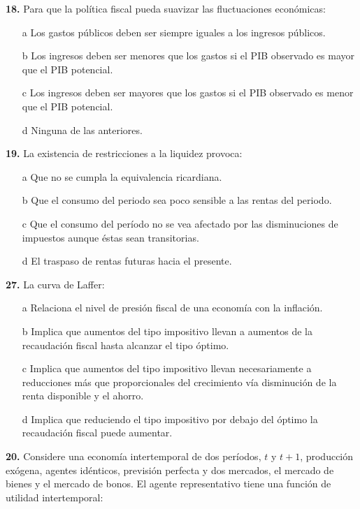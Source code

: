 \documentclass{nuevotema}
\begin{document}
\textbf{18.} Para que la política fiscal pueda suavizar las fluctuaciones económicas:

\begin{itemize}
	\item[a] Los gastos públicos deben ser siempre iguales a los ingresos públicos.
	\item[b] Los ingresos deben ser menores que los gastos si el PIB observado es mayor que el PIB potencial.
	\item[c] Los ingresos deben ser mayores que los gastos si el PIB observado es menor que el PIB potencial.
	\item[d] Ninguna de las anteriores.
\end{itemize}


\textbf{19.} La existencia de restricciones a la liquidez provoca:
\begin{itemize}
	\item[a] Que no se cumpla la equivalencia ricardiana.
	\item[b] Que el consumo del periodo sea poco sensible a las rentas del periodo.
	\item[c] Que el consumo del período no se vea afectado por las disminuciones de impuestos aunque éstas sean transitorias.
	\item[d] El traspaso de rentas futuras hacia el presente.
\end{itemize}

\textbf{27.} La curva de Laffer:
\begin{itemize}
	\item[a] Relaciona el nivel de presión fiscal de una economía con la inflación.
	\item[b] Implica que aumentos del tipo impositivo llevan a aumentos de la recaudación fiscal hasta alcanzar el tipo óptimo.
	\item[c] Implica que aumentos del tipo impositivo llevan necesariamente a reducciones más que proporcionales del crecimiento vía disminución de la renta disponible y el ahorro.
	\item[d] Implica que reduciendo el tipo impositivo por debajo del óptimo la recaudación fiscal puede aumentar.
\end{itemize}

\textbf{20.} Considere una economía intertemporal de dos períodos, $t$ y $t+1$, producción exógena, agentes idénticos, previsión perfecta y dos mercados, el mercado de bienes y el mercado de bonos. El agente representativo tiene una función de utilidad intertemporal:
\end{document}
